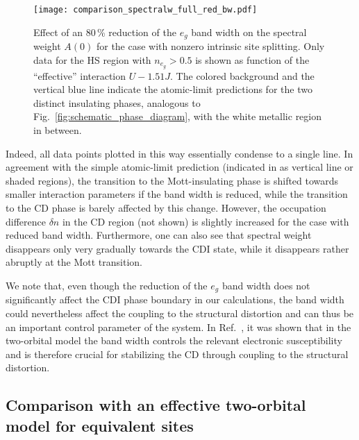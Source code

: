 \documentclass[aps,prb,twocolumn,superscriptaddress,10pt]{revtex4-1}
\newcommand{\pref}[1]{\prettyref{#1}}%
\newcommand{\eg}{\ensuremath{{e_g}}\xspace}
\begin{document}
\begin{figure}
    \centering
    \texttt{[image: comparison\_spectralw\_full\_red\_bw.pdf]}
    \caption{Effect of an 80\,\% reduction of the $e_g$ band width on the spectral weight $A(0)$ for the case with nonzero intrinsic site splitting. Only data for the HS region with $n_\eg > 0.5$ is shown as function of the ``effective'' interaction $U-1.51J$. The colored background and the vertical blue line indicate the atomic-limit predictions for the two distinct insulating phases, analogous to Fig.~\ref{fig:schematic_phase_diagram}, with the white metallic region in between.}
    \label{fig:comp_spectralw_fullredbw}
\end{figure}

Indeed, all data points plotted in this way essentially condense to a single line.
%
In agreement with the simple atomic-limit prediction (indicated in \pref{fig:comp_spectralw_fullredbw} as vertical line or shaded regions), the transition to the Mott-insulating phase is shifted towards smaller interaction parameters if the band width is reduced, while the transition to the CD phase is barely affected by this change.
However, the occupation difference $\delta n$ in the CD region (not shown) is slightly increased for the case with reduced band width. 
Furthermore, one can also see that spectral weight disappears only very gradually 
towards the CDI state, while it disappears rather abruptly at the Mott transition.

We note that, even though the reduction of the $e_g$ band width does not significantly affect the CDI phase boundary in our calculations,  the band width could nevertheless affect the coupling to the structural distortion and can thus be an important control parameter of the system. In Ref.~, it was shown that in the two-orbital model the band width controls the relevant electronic susceptibility and is therefore crucial for stabilizing the CD through coupling to the structural distortion. 

\subsection{Comparison with an effective two-orbital model for equivalent sites}
\end{document}
